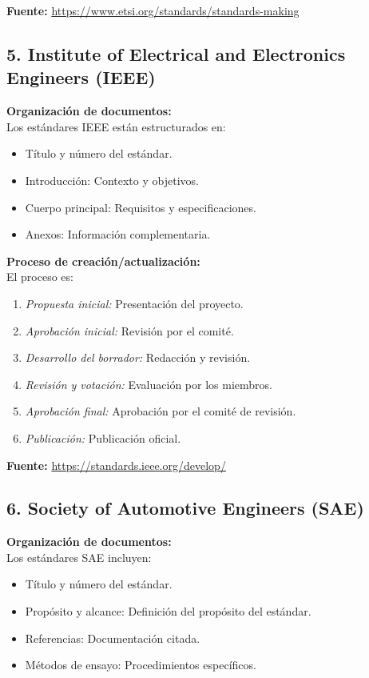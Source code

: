 \documentclass[12pt]{report}
\begin{document}
\textbf{Fuente:} \url{https://www.etsi.org/standards/standards-making}

\subsection*{5. Institute of Electrical and Electronics Engineers (IEEE)}

\textbf{Organización de documentos:} \\
Los estándares IEEE están estructurados en:
\begin{itemize}
	\item Título y número del estándar.
	\item Introducción: Contexto y objetivos.
	\item Cuerpo principal: Requisitos y especificaciones.
	\item Anexos: Información complementaria.
\end{itemize}

\textbf{Proceso de creación/actualización:} \\
El proceso es:
\begin{enumerate}
	\item \textit{Propuesta inicial:} Presentación del proyecto.
	\item \textit{Aprobación inicial:} Revisión por el comité.
	\item \textit{Desarrollo del borrador:} Redacción y revisión.
	\item \textit{Revisión y votación:} Evaluación por los miembros.
	\item \textit{Aprobación final:} Aprobación por el comité de revisión.
	\item \textit{Publicación:} Publicación oficial.
\end{enumerate}

\textbf{Fuente:} \url{https://standards.ieee.org/develop/}

\subsection*{6. Society of Automotive Engineers (SAE)}

\textbf{Organización de documentos:} \\
Los estándares SAE incluyen:
\begin{itemize}
	\item Título y número del estándar.
	\item Propósito y alcance: Definición del propósito del estándar.
	\item Referencias: Documentación citada.
	\item Métodos de ensayo: Procedimientos específicos.
\end{itemize}
\end{document}
